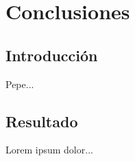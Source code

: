 
\chapter{Conclusiones} %

\label{Conc} %

\section{Introducción}

Pepe...

\section{Resultado}

Lorem ipsum dolor...